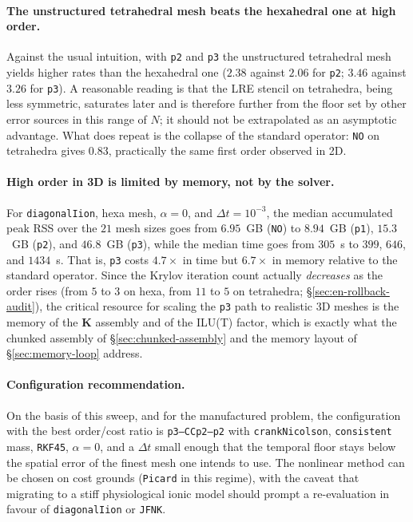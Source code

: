 \documentclass[11pt,a4paper]{article}
\newcommand{\code}[1]{\texttt{\small #1}}
\newcommand{\Kstif}{\mathbf{K}}
\begin{document}
\paragraph{The unstructured tetrahedral mesh beats the hexahedral one at high
order.}
Against the usual intuition, with \code{p2} and \code{p3} the unstructured
tetrahedral mesh yields higher rates than the hexahedral one ($2.38$ against
$2.06$ for \code{p2}; $3.46$ against $3.26$ for \code{p3}). A reasonable reading
is that the LRE stencil on tetrahedra, being less symmetric, saturates later and
is therefore further from the floor set by other error sources in this range of
$N$; it should not be extrapolated as an asymptotic advantage. What does repeat
is the collapse of the standard operator: \code{NO} on tetrahedra gives $0.83$,
practically the same first order observed in 2D.

\paragraph{High order in 3D is limited by memory, not by the solver.}
For \code{diagonalIion}, hexa mesh, $\alpha=0$, and $\Delta t=10^{-3}$, the
median accumulated peak RSS over the $21$ mesh sizes goes from $6.95$~GB
(\code{NO}) to $8.94$~GB (\code{p1}), $15.3$~GB (\code{p2}), and $46.8$~GB
(\code{p3}), while the median time goes from $305$~s to $399$, $646$, and
$1434$~s. That is, \code{p3} costs $4.7\times$ in time but $6.7\times$ in memory
relative to the standard operator. Since the Krylov iteration count actually
\emph{decreases} as the order rises (from $5$ to $3$ on hexa, from $11$ to $5$ on
tetrahedra; \S\ref{sec:en-rollback-audit}), the critical resource for scaling the
\code{p3} path to realistic 3D meshes is the memory of the $\Kstif$ assembly and
of the ILU(T) factor, which is exactly what the chunked assembly of
\S\ref{sec:chunked-assembly} and the memory layout of \S\ref{sec:memory-loop}
address.

\paragraph{Configuration recommendation.}
On the basis of this sweep, and for the manufactured problem, the configuration
with the best order/cost ratio is \code{p3--CCp2--p2} with
\code{crankNicolson}, \code{consistent} mass, \code{RKF45}, $\alpha=0$, and a
$\Delta t$ small enough that the temporal floor stays below the spatial error of
the finest mesh one intends to use. The nonlinear method can be chosen on cost
grounds (\code{Picard} in this regime), with the caveat that migrating to a stiff
physiological ionic model should prompt a re-evaluation in favour of
\code{diagonalIion} or \code{JFNK}.
\end{document}
